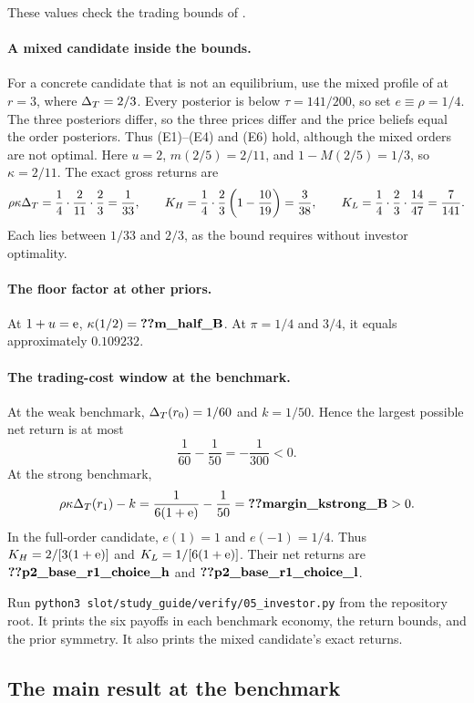 These values check the trading bounds of .

\paragraph{A mixed candidate inside the bounds.}
For a concrete candidate that is not an equilibrium, use the mixed profile of  at $r=3$, where $\Delta_T=2/3$.
Every posterior is below $\tau=141/200$, so set $e\equiv\rho=1/4$.
The three posteriors differ, so the three prices differ and the price beliefs equal the order posteriors.
Thus (E1)--(E4) and (E6) hold, although the mixed orders are not optimal.
Here $u=2$, $m(2/5)=2/11$, and $1-M(2/5)=1/3$, so $\kappa=2/11$.
The exact gross returns are
\[
\rho\kappa\Delta_T=\frac14\cdot\frac2{11}\cdot\frac23=\frac1{33},\qquad
K_H=\frac14\cdot\frac23\left(1-\frac{10}{19}\right)=\frac3{38},\qquad
K_L=\frac14\cdot\frac23\cdot\frac{14}{47}=\frac7{141}.
\]
Each lies between $1/33$ and $2/3$, as the bound requires without investor optimality.

\paragraph{The floor factor at other priors.}
At $1+u=\mathrm{e}$, $\kappa(1/2)=\reg{m_half_B}$.
At $\pi=1/4$ and $3/4$, it equals approximately $0.109232$. %

\paragraph{The trading-cost window at the benchmark.}
At the weak benchmark, $\Delta_T(r_0)=1/60$ and $k=1/50$.
Hence the largest possible net return is at most
\[
\frac1{60}-\frac1{50}=-\frac1{300}<0.
\]
At the strong benchmark,
\[
\rho\kappa\DT(r_1)-k
=\frac1{6(1+\eu)}-\frac1{50}
=\reg{margin_kstrong_B}>0.
\]
In the full-order candidate, $e(1)=1$ and $e(-1)=1/4$.
Thus $K_H=2/[3(1+\mathrm{e})]$ and $K_L=1/[6(1+\mathrm{e})]$.
Their net returns are $\reg{p2_base_r1_choice_h}$ and $\reg{p2_base_r1_choice_l}$.

Run \texttt{python3 slot/study\_guide/verify/05\_investor.py} from the repository root.
It prints the six payoffs in each benchmark economy, the return bounds, and the prior symmetry.
It also prints the mixed candidate's exact returns.

\subsection{The main result at the benchmark}\label{sec:benchmark-main}

